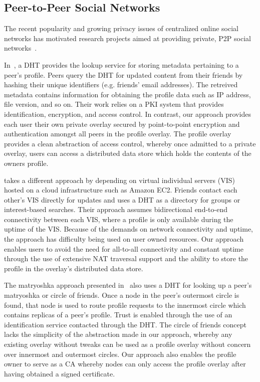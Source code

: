 \documentclass[letterpaper,twocolumn,10pt]{article}
\begin{document}
\subsection{Peer-to-Peer Social Networks}
The recent popularity and growing privacy issues of centralized online social
networks has motivated research projects aimed at providing private, P2P social
networks~\cite{peerson, matryoshka, tribler-osn, vis-a-vis}.

In~\cite{peerson}, a DHT provides the lookup service for storing metadata
pertaining to a peer's profile. Peers query the DHT for updated content from 
their friends by hashing their unique identifiers (e.g. friends' email
addresses).  The retreived metadata contains information for obtaining the
profile data such as IP address, file version, and so on. Their work relies
on a PKI system that provides identification, encryption, and access control.
In contrast, our approach provides each user their own private overlay secured
by point-to-point encryption and authentication amongst all peers in the profile
overlay.  The profile overlay provides a clean abstraction of access control,
whereby once admitted to a private overlay, users can access a distributed data
store which holds the contents of the owners profile.

\cite{vis-a-vis} takes a different approach by depending on virtual individual
servers (VIS) hosted on a cloud infrastructure such as Amazon EC2. Friends
contact each other's VIS directly for updates and uses a DHT as a directory for
groups or interest-based searches. Their approach assumes bidirectional
end-to-end connectivity between each VIS, where a profile is only available
during the uptime of the VIS.  Because of the demands on network connectivity
and uptime, the approach has difficulty being used on user owned resources.
Our approach enables users to avoid the need for all-to-all connectivity and
constant uptime through the use of extensive NAT traversal support and the
ability to store the profile in the overlay's distributed data store.

The matryoshka approach presented in~\cite{matryoshka} also uses a DHT for
looking up a peer's matryoshka or circle of friends. Once a node in the peer's
outermost circle is found, that node is used to route profile requests to the
innermost circle which contains replicas of a peer's profile. Trust is enabled
through the use of an identification service contacted through the DHT.  The
circle of friends concept lacks the simplicity of the abstraction made in our
approach, whereby any existing overlay without tweaks can be used as a profile
overlay without concern over innermost and outermost circles.  Our approach
also enables the profile owner to serve as a CA whereby nodes can only access
the profile overlay after having obtained a signed certificate.
\end{document}
